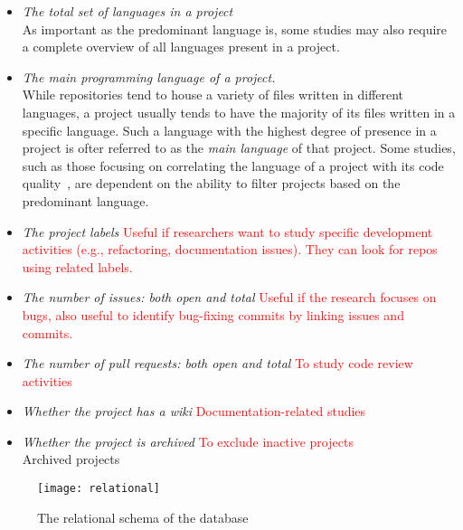 \begin{itemize}
    \item \textit{The total set of languages in a project}
    \\As important as the predominant language is, some studies may also require a complete overview of all languages present in a project.
    \item \textit{The main programming language of a project.}
    \\While repositories tend to house a variety of files written in different languages, a project usually tends to have the majority of its files written in a specific language. Such a language with the highest degree of presence in a project is ofter referred to as the \textit{main language} of that project. Some studies, such as those focusing on correlating the language of a project with its code quality~\cite{QUALITY}, are dependent on the ability to filter projects based on the predominant language.
    \item \textit{The project labels} \textcolor{red}{Useful if researchers want to study specific development activities (e.g., refactoring, documentation issues). They can look for repos using related labels.}
    \item \textit{The number of issues: both open and total} \textcolor{red}{Useful if the research focuses on bugs, also useful to identify bug-fixing commits by linking issues and commits.}
    \item \textit{The number of pull requests: both open and total} \textcolor{red}{To study code review activities}
    \item \textit{Whether the project has a wiki} \textcolor{red}{Documentation-related studies}
    \item \textit{Whether the project is archived} \textcolor{red}{To exclude inactive projects}
    \\Archived projects
\end{itemize}


\begin{figure}[ht!]
    \centering
    \texttt{[image: relational]}
    \caption{The relational schema of the database}
\end{figure}

